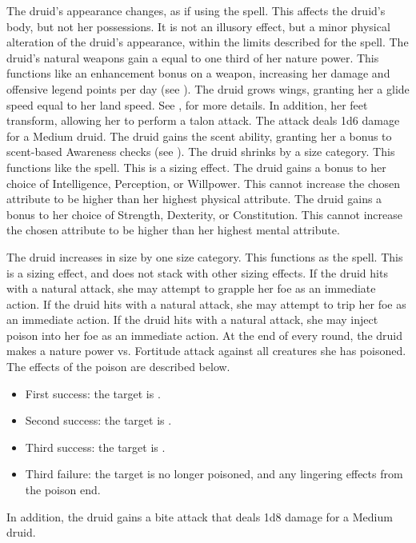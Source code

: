         The druid's appearance changes, as if using the  spell.
        This affects the druid's body, but not her possessions.
        It is not an illusory effect, but a minor physical alteration of the druid's appearance, within the limits described for the spell.
        The druid's natural weapons gain a  equal to one third of her nature power.
        This functions like an enhancement bonus on a weapon, increasing her damage and offensive legend points per day (see ).
        The druid grows wings, granting her a glide speed equal to her land speed.
        See , for more details.
        In addition, her feet transform, allowing her to perform a talon attack.
        The attack deals 1d6 damage for a Medium druid.
        The druid gains the scent ability, granting her a  bonus to scent-based Awareness checks (see ).
        The druid shrinks by a size category.
        This functions like the  spell.
        This is a sizing effect.
        The druid gains a  bonus to her choice of Intelligence, Perception, or Willpower.
        This cannot increase the chosen attribute to be higher than her highest physical attribute.
        The druid gains a  bonus to her choice of Strength, Dexterity, or Constitution.
        This cannot increase the chosen attribute to be higher than her highest mental attribute.

        The druid increases in size by one size category.
        This functions as the  spell.
        This is a sizing effect, and does not stack with other sizing effects.
        If the druid hits with a natural attack, she may attempt to grapple her foe as an immediate action.
        If the druid hits with a natural attack, she may attempt to trip her foe as an immediate action.
        If the druid hits with a natural attack, she may inject poison into her foe as an immediate action.
        At the end of every round, the druid makes a nature power vs. Fortitude attack against all creatures she has poisoned.
        The effects of the poison are described below.
        \begin{itemize}
            \item First success: the target is \sickened.
            \item Second success: the target is \staggered.
            \item Third success: the target is \nauseated.
            \item Third failure: the target is no longer poisoned, and any lingering effects from the poison end.
        \end{itemize}
        \par In addition, the druid gains a bite attack that deals 1d8 damage for a Medium druid.

